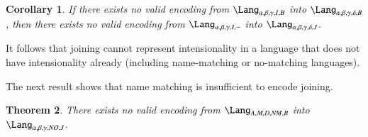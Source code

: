 \documentclass[submission,copyright,creativecommons]{eptcs}
\newtheorem{theorem}{Theorem}[section]
\newtheorem{corollary}[theorem]{Corollary}
\begin{document}
\begin{corollary}
If there exists no valid encoding from
$\Lang_{\alpha,\beta,\gamma,I,B}$ into $\Lang_{\alpha,\beta,\gamma,\delta,B}$, then there exists
no valid encoding from $\Lang_{\alpha,\beta,\gamma,I,-}$ into $\Lang_{\alpha,\beta,\gamma,\delta,J}$.
\end{corollary}

It follows that joining cannot represent intensionality in a language that does not have intensionality
already (including name-matching or no-matching languages).

The next result shows that name matching is insufficient to encode joining.

\begin{theorem}
\label{thm:no_name_2_join}
There exists no valid encoding from $\Lang_{A,M,D,\mathit{NM},B}$ into
$\Lang_{\alpha,\beta,\gamma,\mathit{NO},J}$.
\end{theorem}
\end{document}

